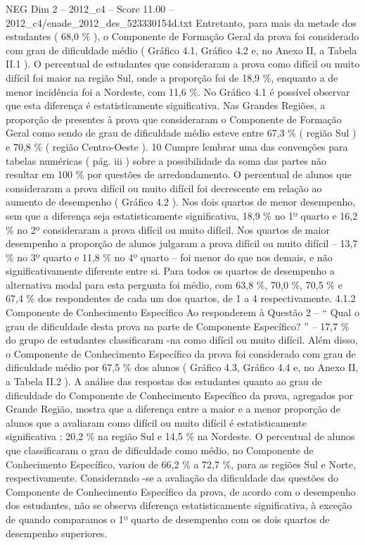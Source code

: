 \begin{textsample}{NEG Dim 2 – 2012\_c4 – Score 11.00 – 2012\_c4/enade\_2012\_des\_523330154d.txt}
Entretanto, para mais da metade dos estudantes ( 68,0 \% ), o Componente de Formação Geral da prova foi considerado com grau de dificuldade médio ( Gráfico 4.1, Gráfico 4.2 e, no Anexo II, a Tabela II.1 ).
O percentual de estudantes que consideraram a prova como difícil ou muito difícil foi maior na região Sul, onde a proporção foi de 18,9 \%, enquanto a de menor incidência foi a Nordeste, com 11,6 \%.
No Gráfico 4.1 é possível observar que esta diferença é estatisticamente significativa.
Nas Grandes Regiões, a proporção de presentes à prova que consideraram o Componente de Formação Geral como sendo de grau de dificuldade médio esteve entre 67,3 \% ( região Sul ) e 70,8 \% ( região Centro-Oeste ). 10 Cumpre lembrar uma das convenções para tabelas numéricas ( pág. iii ) sobre a possibilidade da soma das partes não resultar em 100 \% por questões de arredondamento.
O percentual de alunos que consideraram a prova difícil ou muito difícil foi decrescente em relação ao aumento de desempenho ( Gráfico 4.2 ).
Nos dois quartos de menor desempenho, sem que a diferença seja estatisticamente significativa, 18,9 \% no 1º quarto e 16,2 \% no 2º consideraram a prova difícil ou muito difícil.
Nos quartos de maior desempenho a proporção de alunos julgaram a prova difícil ou muito difícil – 13,7 \% no 3º quarto e 11,8 \% no 4º quarto – foi menor do que nos demais, e não significativamente diferente entre si.
Para todos os quartos de desempenho a alternativa modal para esta pergunta foi médio, com 63,8 \%, 70,0 \%, 70,5 \% e 67,4 \% dos respondentes de cada um dos quartos, de 1 a 4 respectivamente. 4.1.2 Componente de Conhecimento Específico Ao responderem à Questão 2 – “ Qual o grau de dificuldade desta prova na parte de Componente Específico? ” – 17,7 \% do grupo de estudantes classificaram -na como difícil ou muito difícil.
Além disso, o Componente de Conhecimento Específico da prova foi considerado com grau de dificuldade médio por 67,5 \% dos alunos ( Gráfico 4.3, Gráfico 4.4 e, no Anexo II, a Tabela II.2 ).
A análise das respostas dos estudantes quanto ao grau de dificuldade do Componente de Conhecimento Específico da prova, agregados por Grande Região, mostra que a diferença entre a maior e a menor proporção de alunos que a avaliaram como difícil ou muito difícil é estatisticamente significativa : 20,2 \% na região Sul e 14,5 \% na Nordeste.
O percentual de alunos que classificaram o grau de dificuldade como médio, no Componente de Conhecimento Específico, variou de 66,2 \% a 72,7 \%, para as regiões Sul e Norte, respectivamente.
Considerando -se a avaliação da dificuldade das questões do Componente de Conhecimento Específico da prova, de acordo com o desempenho dos estudantes, não se observa diferença estatisticamente significativa, à exceção de quando comparamos o 1º quarto de desempenho com os dois quartos de desempenho superiores.

\end{textsample}
